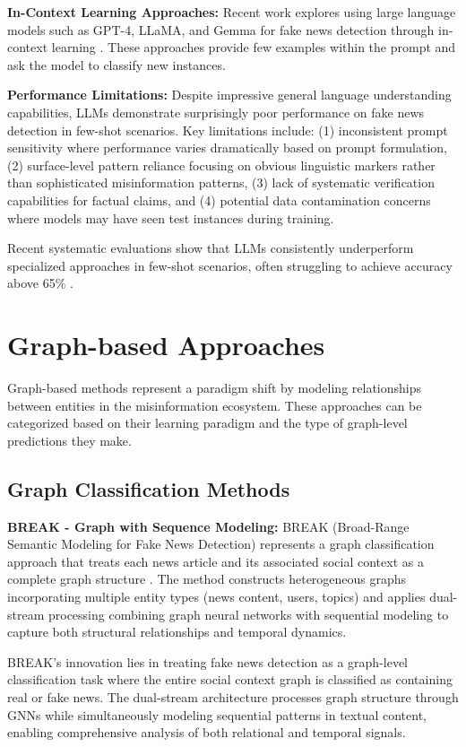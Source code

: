 \textbf{In-Context Learning Approaches:} Recent work explores using large language models such as GPT-4, LLaMA, and Gemma for fake news detection through in-context learning \cite{touvron2023llama, team2024gemma}. These approaches provide few examples within the prompt and ask the model to classify new instances.

\textbf{Performance Limitations:} Despite impressive general language understanding capabilities, LLMs demonstrate surprisingly poor performance on fake news detection in few-shot scenarios. Key limitations include: (1) inconsistent prompt sensitivity where performance varies dramatically based on prompt formulation, (2) surface-level pattern reliance focusing on obvious linguistic markers rather than sophisticated misinformation patterns, (3) lack of systematic verification capabilities for factual claims, and (4) potential data contamination concerns where models may have seen test instances during training.

Recent systematic evaluations show that LLMs consistently underperform specialized approaches in few-shot scenarios, often struggling to achieve accuracy above 65\% \cite{huang2023chatgpt, zhang2023can}.

\section{Graph-based Approaches}

Graph-based methods represent a paradigm shift by modeling relationships between entities in the misinformation ecosystem. These approaches can be categorized based on their learning paradigm and the type of graph-level predictions they make.

\subsection{Graph Classification Methods}

\textbf{BREAK - Graph with Sequence Modeling:} BREAK (Broad-Range Semantic Modeling for Fake News Detection) represents a graph classification approach that treats each news article and its associated social context as a complete graph structure \cite{ji2023break}. The method constructs heterogeneous graphs incorporating multiple entity types (news content, users, topics) and applies dual-stream processing combining graph neural networks with sequential modeling to capture both structural relationships and temporal dynamics.

BREAK's innovation lies in treating fake news detection as a graph-level classification task where the entire social context graph is classified as containing real or fake news. The dual-stream architecture processes graph structure through GNNs while simultaneously modeling sequential patterns in textual content, enabling comprehensive analysis of both relational and temporal signals.

